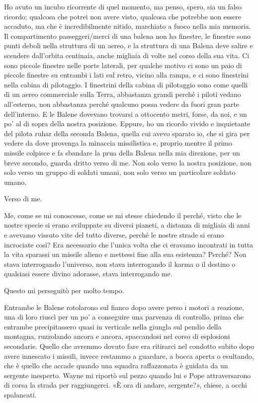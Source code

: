 Ho avuto un incubo ricorrente di quel momento, ma penso, spero, sia un
falso ricordo; qualcosa che potrei non avere visto, qualcosa che
potrebbe non essere accaduto, ma che è incredibilmente nitido, marchiato
a fuoco nella mia memoria. Il compartimento passeggeri/merci di una
balena non ha finestre, le finestre sono punti deboli nella struttura di
un aereo, e la struttura di una Balena deve salire e scendere
dall'orbita centinaia, anche migliaia di volte nel corso della sua vita.
Ci sono piccole finestre nelle porte laterali, per qualche motivo ci
sono un paio di piccole finestre su entrambi i lati sul retro, vicino
alla rampa, e ci sono finestrini nella cabina di pilotaggio. I
finestrini della cabina di pilotaggio sono come quelli di un aereo
commerciale sulla Terra, abbastanza grandi perché i piloti vedano
all'esterno, non abbastanza perché qualcuno possa vedere da fuori gran
parte dell'interno. E le Balene dovevano trovarsi a ottocento metri,
forse, da noi, e un po' al di sopra della nostra posizione. Eppure, ho
un ricordo vivido e inquietante del pilota ruhar della seconda Balena,
quella cui avevo sparato io, che si gira per vedere da dove provenga la
minaccia missilistica e, proprio mentre il primo missile colpisce e fa
sbandare la prua della Balena nella mia direzione, per un breve secondo,
guarda dritto verso di me. Non solo verso la nostra posizione, non solo
verso un gruppo di soldati umani, non solo verso un particolare soldato
umano.

Verso di me.

Me, come se mi conoscesse, come se mi stesse chiedendo il perché, visto
che le nostre specie si erano sviluppate su diversi pianeti, a distanza
di migliaia di anni e avevamo vissuto vite del tutto diverse, perché le
nostre strade si erano incrociate così? Era necessario che l'unica volta
che ci eravamo incontrati in tutta la vita sparassi un missile alieno e
mettessi fine alla sua esistenza? Perché? Non stava interrogando
l'universo, non stava interrogando il karma o il destino o qualsiasi
essere divino adorasse, stava interrogando me.

Questo mi perseguitò per molto tempo.

Entrambe le Balene rotolarono sul fianco dopo avere perso i motori a
reazione, una di loro riuscì per un po' a conseguire una parvenza di
controllo, prima che entrambe precipitassero quasi in verticale nella
giungla sul pendio della montagna, ruzzolando ancora e ancora,
spaccandosi nel corso di esplosioni secondarie. Quello che avremmo
dovuto fare era ritirarci nel condotto subito dopo avere innescato i
missili, invece restammo a guardare, a bocca aperta o esultando, che è
quello che accade quando una squadra raffazzonata è guidata da un
sergente inesperto. Wayne mi riportò sul pezzo quando lui e Pope
attraversarono di corsa la strada per raggiungerci. «È ora di andare,
sergente?», chiese, a occhi spalancati.

